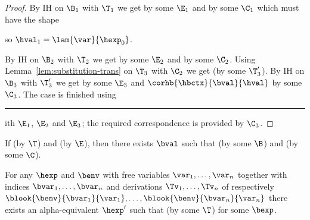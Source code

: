 \begin{proof}
By IH on $\B_1$ with $\T_1$ we get  by some $\E_1$ and  by some $\C_1$ which must have the shape
\begin{prooftree}
\end{prooftree}
so $\hval_1 = \lam{\var}{\hexp_0}$.

By IH on $\B_2$ with $\T_2$ we get  by some $\E_2$ and  by some $\C_2$.
Using Lemma~\ref{lem:substitution-trans} on $\T_3$ with $\C_2$ we get  (by some $\T_3'$).
By IH on $\B_3$ with $\T_3'$ we get  by some $\E_3$ and $\corhb{\hbctx}{\bval}{\hval}$ by some $\C_3$.
The case is finished using \rule{E-App} with $\E_1$, $\E_2$ and $\E_3$; the required correspondence is provided by $\C_3$.

\end{proof}

\begin{lemma}[Completeness]
\label{lem:completeness-hb}
If \trahb{\hbctx}{\benv}{\hexp}{\bexp} (by $\T$) and \hev{\hexp}{\hval} (by $\E$), then there exists $\bval$ such that \bev{\benv}{\bexp}{\bval} (by some $\B$) and \corhb{\hbctx}{\bval}{\hval} (by some $\C$).
\end{lemma}

\begin{lemma}[Totality]
For any $\hexp$ and $\benv$ with free variables $\var_1, \ldots, \var_n$ together with indices $\bvar_1, \ldots, \bvar_n$ and derivations $\Tv_1, \ldots, \Tv_n$ of respectively $\blook{\benv}{\bvar_1}{\var_1}, \ldots, \blook{\benv}{\bvar_n}{\var_n}$ there exists an alpha-equivalent $\hexp'$ such that  (by some $\T$) for some $\bexp$.
\end{lemma}

